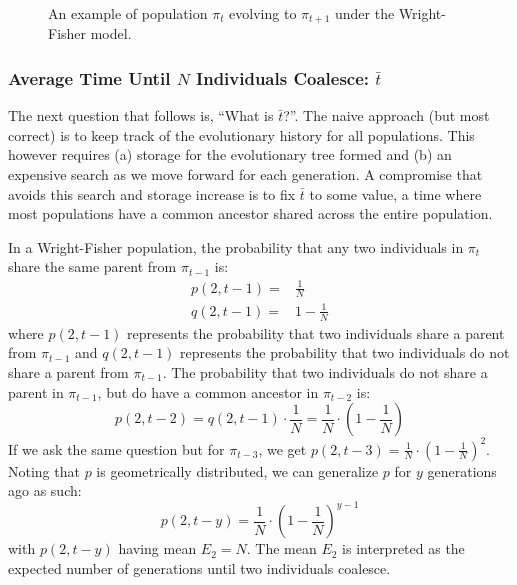 \begin{figure}
    \centering{}
    \caption{An example of population $\pi_{t}$ evolving to $\pi_{t+1}$ under the Wright-Fisher model.}
    \label{fig:wrightFisherEvolution}
\end{figure}

\subsubsection{Average Time Until $N$ Individuals Coalesce: $\bar{t}$}
The next question that follows is, ``What is $\bar{t}$?''.
The naive approach (but most correct) is to keep track of the evolutionary history for all populations.
This however requires (a) storage for the evolutionary tree formed and (b) an expensive search as we move forward for
each generation.
A compromise that avoids this search and storage increase is to fix $\bar{t}$ to some value, a time where most
populations have a common ancestor shared across the entire population.

In a Wright-Fisher population, the probability that any two individuals in $\pi_t$ share the same parent from
$\pi_{t-1}$ is:
\begin{equation}
    \begin{aligned}
        p(2, t-1) =& \frac{1}{N} \\
        q(2, t-1) =& 1 - \frac{1}{N}
    \end{aligned}
\end{equation}
where $p(2, t-1)$ represents the probability that two individuals share a parent from $\pi_{t-1}$ and
$q(2, t-1)$ represents the probability that two individuals do not share a parent from $\pi_{t-1}$.
The probability that two individuals do not share a parent in $\pi_{t-1}$, but do have a common ancestor
in $\pi_{t-2}$ is:
\begin{equation}
    p(2, t-2) = q(2, t-1) \cdot \frac{1}{N} = \frac{1}{N} \cdot \left(1 - \frac{1}{N}\right)
\end{equation}
If we ask the same question but for $\pi_{t-3}$, we get $p(2, t-3) = \frac{1}{N} \cdot  \left(1 - \frac{1}{N}\right)^2$.
Noting that $p$ is geometrically distributed, we can generalize $p$ for $y$ generations ago as such:
\begin{equation}
    p(2, t-y) = \frac{1}{N} \cdot \left(1 - \frac{1}{N}\right)^{y-1}
\end{equation}
with $p(2, t-y)$ having mean $E_2 = N$.
The mean $E_2$ is interpreted as the expected number of generations until two individuals coalesce.

